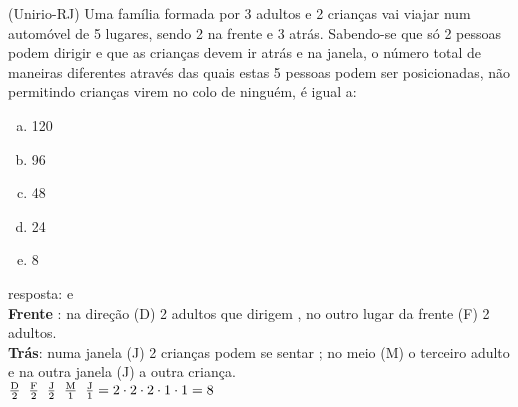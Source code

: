 \begin{ex}
 (Unirio-RJ) Uma família formada por 3 adultos e 2 crianças vai viajar num automóvel de 5 lugares, sendo 2 na frente e 3 atrás. Sabendo-se que só 2 pessoas podem dirigir e que as crianças devem ir atrás e na janela, o número total de maneiras diferentes  através das quais estas 5 pessoas podem ser posicionadas, não permitindo crianças virem no colo de ninguém, é igual a:
    \begin{enumerate}[(a)]
    \item 120
    \item 96
    \item 48
    \item 24
    \item 8
    \end{enumerate}
       \begin{sol}
       resposta: e  \\  
        \textbf{Frente} : na direção (D) 2 adultos que dirigem , no outro lugar da frente (F) 2 adultos.  \\
       \textbf{Trás}: numa janela (J) 2 crianças podem se sentar ; no meio (M) o terceiro adulto e na outra janela (J) a outra criança.\\
       $\frac{\mathrm{D}}{2}\hspace{0.2cm}\frac{\mathrm{F}}{2}\hspace{0.2cm}\frac{\mathrm{J}}{2}\hspace{0.2cm}\frac{\mathrm{M}}{1}\hspace{0.2cm}\frac{\mathrm{J}}{1}=2\cdot2\cdot2\cdot1\cdot1=8$ \\
   \end{sol}
\end{ex}